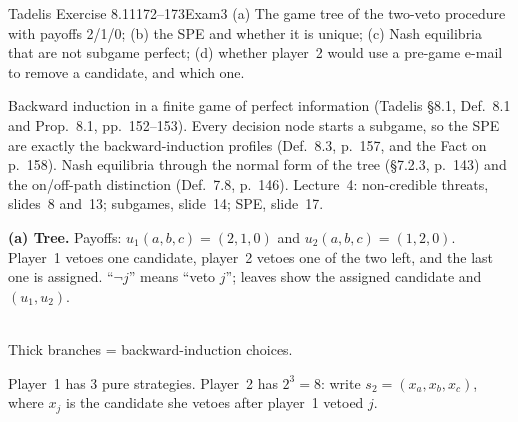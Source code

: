 \begin{exsol}{Tadelis Exercise 8.11}{172--173}{Exam}{3}
\asked (a) The game tree of the two-veto procedure with payoffs 2/1/0; (b) the SPE and whether it
is unique; (c) Nash equilibria that are not subgame perfect; (d) whether player~2 would use a
pre-game e-mail to remove a candidate, and which one.

\method Backward induction in a finite game of perfect information (Tadelis \S8.1, Def.~8.1 and
Prop.~8.1, pp.~152--153). Every decision node starts a subgame, so the SPE are exactly the
backward-induction profiles (Def.~8.3, p.~157, and the Fact on p.~158). Nash equilibria through the
normal form of the tree (\S7.2.3, p.~143) and the on/off-path distinction (Def.~7.8, p.~146).
Lecture~4: non-credible threats, slides~8 and~13; subgames, slide~14; SPE, slide~17.

\solution
\textbf{(a) Tree.} Payoffs: $u_1(a,b,c) = (2,1,0)$ and $u_2(a,b,c) = (1,2,0)$. Player~1 vetoes one
candidate, player~2 vetoes one of the two left, and the last one is assigned. ``$\neg j$'' means
``veto $j$''; leaves show the assigned candidate and $(u_1,u_2)$.
\begin{center}
\\[2pt]
{\footnotesize Thick branches = backward-induction choices.}
\end{center}
Player~1 has 3 pure strategies. Player~2 has $2^3 = 8$: write $s_2 = (x_a, x_b, x_c)$, where $x_j$ is the
candidate she vetoes after player~1 vetoed $j$.


\end{exsol}
